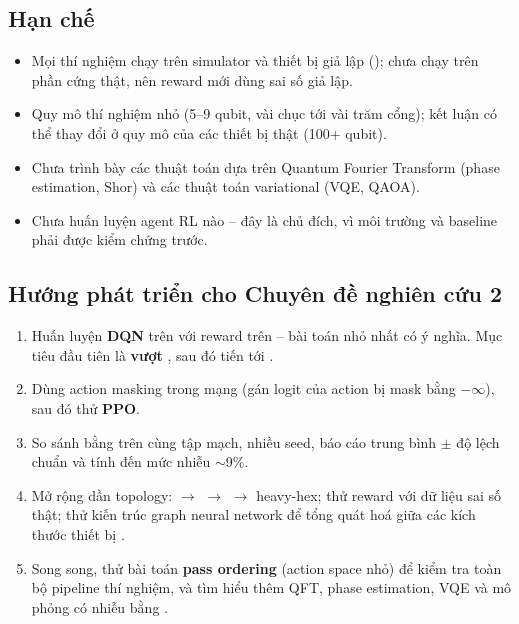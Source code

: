 \subsection{Hạn chế}

\begin{itemize}[noitemsep]
  \item Mọi thí nghiệm chạy trên simulator và thiết bị giả lập (); chưa chạy
    trên phần cứng thật, nên reward  mới dùng sai số giả lập.
  \item Quy mô thí nghiệm nhỏ (5--9 qubit, vài chục tới vài trăm cổng); kết luận có thể thay đổi ở
    quy mô của các thiết bị thật (100+ qubit).
  \item Chưa trình bày các thuật toán dựa trên Quantum Fourier Transform (phase estimation, Shor) và
    các thuật toán variational (VQE, QAOA).
  \item Chưa huấn luyện agent RL nào -- đây là chủ đích, vì môi trường và baseline phải được kiểm chứng
    trước.
\end{itemize}

\subsection{Hướng phát triển cho Chuyên đề nghiên cứu 2}

\begin{enumerate}[noitemsep]
  \item Huấn luyện \textbf{DQN} trên  với reward  trên  --
    bài toán nhỏ nhất có ý nghĩa. Mục tiêu đầu tiên là \textbf{vượt }, sau đó tiến
    tới .
  \item Dùng action masking trong mạng (gán logit của action bị mask bằng $-\infty$), sau đó thử
    \textbf{PPO}.
  \item So sánh bằng  trên cùng tập mạch, nhiều seed, báo cáo
    trung bình $\pm$ độ lệch chuẩn và tính đến mức nhiễu $\sim$9\%.
  \item Mở rộng dần topology:  $\to$  $\to$  $\to$
    heavy-hex; thử reward  với dữ liệu sai số thật; thử kiến trúc graph neural network
    để tổng quát hoá giữa các kích thước thiết bị \cite{riu2025zx}.
  \item Song song, thử bài toán \textbf{pass ordering} (action space nhỏ) để kiểm tra toàn bộ pipeline
    thí nghiệm, và tìm hiểu thêm QFT, phase estimation, VQE và mô phỏng có nhiễu bằng
    .
\end{enumerate}
